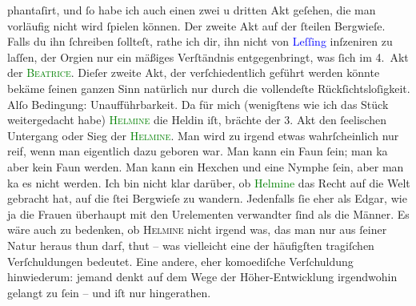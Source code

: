                phantaſirt, und ſo habe ich auch einen zwei u dritten Akt geſehen, die man vorläufig nicht wird ſpielen können. Der
               zweite Akt auf der ſteilen Bergwieſe. Falls du ihn ſchreiben ſollteſt, rathe ich dir,
               ihn nicht von \textcolor{blue}{Leſſing}{}\ledrightnote{\textcolor{blue}{Emil Lessing}} inſzeniren zu laſſen, der
               Orgien nur ein mäßiges Verſtändnis entgegenbringt, was {\pb}ſich im 4. Akt der \textcolor{green}{\textsc{Beatrice}}{}\ledrightnote{\textcolor{green}{Der Schleier der Beatrice. Schauspiel in fünf Akten}}{ }\label{K_L01604_1v}\label{K_L01604_1h}. Dieſer zweite
               Akt, der verſchiedentlich geführt werden könnte bekäme ſeinen ganzen Sinn natürlich
               nur durch die vollendeſte Rückſichtsloſigkeit. Alſo Bedingung: Unaufführbarkeit. Da
               für mich (wenigſtens wie ich das Stück weitergedacht habe) \textsc{\textcolor{green}{Helmine}{}} die Heldin iſt, brächte der 3. Akt den ſeelischen Untergang oder Sieg der \textsc{\textcolor{green}{Helmine}{}}. Man wird zu irgend etwas wahrſcheinlich nur reif, wenn man eigentlich dazu
               geboren war. Man kann ein Faun ſein; man ka{\geminationn}{ }{\pb}aber kein Faun werden.
               Man kann ein Hexchen und eine Nymphe ſein, aber man ka{\geminationn}
               es nicht werden. Ich bin nicht klar darüber, ob \textcolor{green}{Helmine}{} das Recht auf die Welt gebracht hat, auf die
                  ſtei Bergwieſe zu wandern. Jedenfalls ſie eher als Edgar, wie ja die Frauen
               überhaupt mit den Urelementen verwandter ſind als die Männer. Es wäre auch zu
               bedenken, ob \textsc{Helmine} nicht irgend was, das man nur aus {\pb}ſeiner Natur heraus
               thun darf, \label{K_L01604_2v}\label{K_L01604_2h} thut – was
               vielleicht eine der häufigſten tragiſchen Verſchuldungen bedeutet. Eine andere, eher
               komoediſche Verſchuldung hinwiederum: jemand denkt auf dem Wege der \introOben{}Höher-\introOben{}Entwicklung irgendwohin gelangt  zu ſein – und iſt nur \label{K_L01604_3v}\label{K_L01604_3h} hingerathen.
